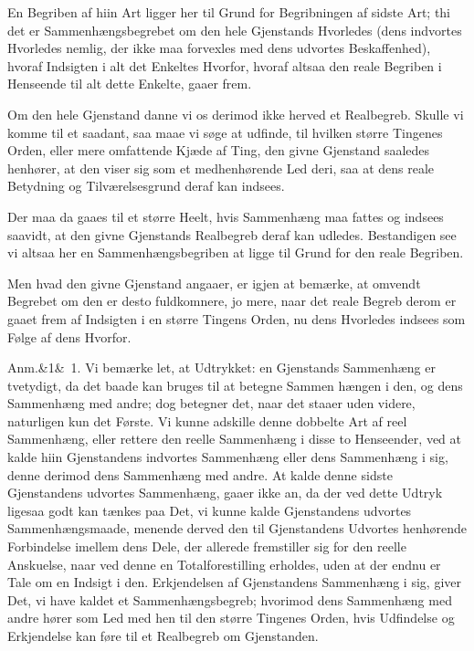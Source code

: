 \documentclass[12pt]{book}
\def\sperr#1{#1}%
\def\textit#1{#1}%
\def\emph#1{#1}%
\newcommand{\sperr}[1]{\textls[180]{#1}}
\newcommand{\anm}[1]{%
  \par\vspace{0.5\baselineskip}%
  \noindent\hspace{\parindent}\sperr{Anm.}\ifx&#1&\else~\textit{#1}.\fi
  \enspace\ignorespaces
}
\newcommand{\opage}[1]{\marginnote{\footnotesize\textit{[#1]}}}
\begin{document}
\opage{46} En Begriben af hiin Art ligger her til Grund for Begribningen af sidste Art;
thi det er Sammenhængsbegrebet om den hele Gjenstands Hvorledes (dens
indvortes Hvorledes nemlig, der ikke maa forvexles med dens udvortes
Beskaffenhed), hvoraf Indsigten i alt det Enkeltes Hvorfor, hvoraf altsaa den
reale Begriben i Henseende til alt dette Enkelte, gaaer frem.

Om den hele Gjenstand danne vi os derimod ikke herved et Realbegreb. Skulle vi
komme til et saadant, saa maae vi søge at udfinde, til hvilken større Tingenes
Orden, eller mere omfattende Kjæde af Ting, den givne Gjenstand saaledes
henhører, at den viser sig som et medhenhørende Led deri, saa at dens reale
Betydning og Tilværelsesgrund deraf kan indsees.

Der maa da gaaes til et større Heelt, hvis Sammenhæng maa fattes og indsees
saavidt, at den givne Gjenstands Realbegreb deraf kan udledes. Bestandigen see
vi altsaa her en Sammenhængsbegriben at ligge til Grund for den reale
Begriben.

Men hvad den givne Gjenstand angaaer, er igjen at bemærke, at omvendt Begrebet
om den er desto fuldkomnere, jo mere, naar det reale Begreb derom er gaaet frem
af Indsigten i en større Tingens Orden, nu dens Hvorledes indsees som Følge af
dens Hvorfor.

\anm{1} Vi bemærke let, at Udtrykket: en Gjenstands Sammenhæng er tvetydigt, da
det baade kan bruges til at betegne Sammen%
\opage{47}hængen i den, og dens Sammenhæng med andre; dog betegner det, naar det staaer
uden videre, naturligen kun det Første. Vi kunne adskille denne dobbelte Art af
reel Sammenhæng, eller rettere den reelle Sammenhæng i disse to Henseender, ved
at kalde hiin Gjenstandens \emph{indvortes Sammenhæng eller dens Sammenhæng i
sig}, denne derimod dens \emph{Sammenhæng med andre}. At kalde denne sidste
Gjenstandens \emph{udvortes Sammenhæng}, gaaer ikke an, da der ved dette Udtryk
ligesaa godt kan tænkes paa Det, vi kunne kalde Gjenstandens \emph{udvortes
Sammenhængsmaade}, menende derved den til Gjenstandens Udvortes henhørende
Forbindelse imellem dens Dele, der allerede fremstiller sig for den reelle
Anskuelse, naar ved denne en Totalforestilling erholdes, uden at der endnu er
Tale om en Indsigt i den. Erkjendelsen af Gjenstandens \emph{Sammenhæng i sig},
giver Det, vi have kaldet et \emph{Sammenhængsbegreb}; hvorimod dens
\emph{Sammenhæng med andre} hører som Led med hen til den større Tingenes
Orden, hvis Udfindelse og Erkjendelse kan føre til et Realbegreb om
Gjenstanden.
\end{document}

